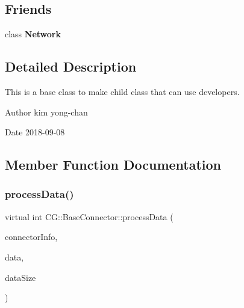 \subsection*{Friends}
\begin{DoxyCompactItemize}
\item 
\mbox{\label{class_c_g_1_1_base_connector_a88b59289ffd793fecd040d32e397b1e9}} 
class {\bfseries Network}
\end{DoxyCompactItemize}


\subsection{Detailed Description}
This is a base class to make child class that can use developers. 

\begin{DoxyAuthor}{Author}
kim yong-\/chan 
\end{DoxyAuthor}
\begin{DoxyDate}{Date}
2018-\/09-\/08 
\end{DoxyDate}


\subsection{Member Function Documentation}
\mbox{\label{class_c_g_1_1_base_connector_adf8eae41d668ead0f14e7f86b3cea825}} 
\subsubsection{\texorpdfstring{process\+Data()}{processData()}}
{\footnotesize\ttfamily virtual int C\+G\+::\+Base\+Connector\+::process\+Data (\begin{DoxyParamCaption}\item[{\mbox{\hyperlink{class_c_g_1_1_connector_info}{Connector\+Info}} $\ast$}]{connector\+Info,  }\item[{char $\ast$}]{data,  }\item[{int}]{data\+Size }\end{DoxyParamCaption})\hspace{0.3cm}{\ttfamily [pure virtual]}}



